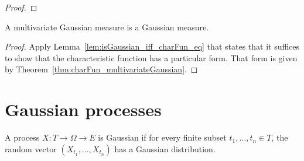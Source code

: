 \begin{proof}

\end{proof}


\begin{lemma}\label{lem:isGaussian_multivariateGaussian}
A multivariate Gaussian measure is a Gaussian measure.
\end{lemma}

\begin{proof}
Apply Lemma~\ref{lem:isGaussian_iff_charFun_eq} that states that it suffices to show that the characteristic function has a particular form.
That form is given by Theorem~\ref{thm:charFun_multivariateGaussian}.
\end{proof}


\section{Gaussian processes}
\label{sec:gaussian_processes}

\begin{definition}\label{def:IsGaussianProcess}
A process $X : T \to \Omega \to E$ is Gaussian if for every finite subset $t_1, \ldots, t_n \in T$, the random vector $(X_{t_1}, \ldots, X_{t_n})$ has a Gaussian distribution.
\end{definition}
